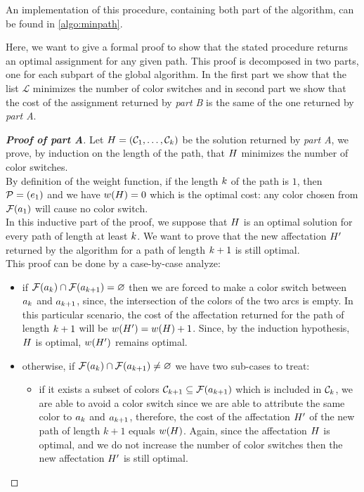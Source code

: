 An implementation of this procedure, containing both part of the algorithm, can be found in \cref{algo:minpath}.

Here, we want to give a formal proof to show that the stated procedure returns an optimal assignment for any given path. This proof is decomposed in two parts, one for each subpart of the global algorithm. In the first part we show that the list $\mathcal{L}$ minimizes the number of color switches and in second part we show that the cost of the assignment returned by \textit{part B} is the same of the one returned by \textit{part A}.

\begin{proof}[\normalfont\textbf{Proof of \textit{part A}}]
	\def\solPartOne{\affect}
	Let $\solPartOne = \row{\C}{\len}$ be the solution returned by \textit{part A}, we prove, by induction on the length of the path, that $\solPartOne$ minimizes the number of color switches. \\
	By definition of the weight function, if the length $k$ of the path is $1$, then $\mathcal{P} = (e_1)$ and we have $\weight(\solPartOne) = 0$ which is the optimal cost: any color chosen from $\mathcal{F}(a_1)$ will cause no color switch.\\
	In this inductive part of the proof, we suppose that $\solPartOne$ is an optimal solution for every path of length at least $k$. We want to prove that the new affectation $\solPartOne'$ returned by the algorithm for a path of length $k+1$ is still optimal. \\
	This proof can be done by a case-by-case analyze:

	\begin{itemize}
		\item if $\mathcal{F}(a_k) \cap \mathcal{F}(a_{k+1}) = \varnothing$ then we are forced to make a color switch between $a_k$ and $a_{k+1}$, since, the intersection of the colors of the two arcs is empty. In this particular scenario, the cost of the affectation returned for the path of length $k + 1$ will be $\weight(\solPartOne') = \weight(\solPartOne) + 1$. Since, by the induction hypothesis, $\solPartOne$ is optimal, $w(H')$ remains optimal.
		\item otherwise, if $\mathcal{F}(a_k) \cap \mathcal{F}(a_{k+1}) \neq \varnothing$ we have two sub-cases to treat:
		      \begin{itemize}

			      \item if it exists a subset of colors $\mathcal{C}_{k+1} \subseteq \mathcal{F}(a_{k+1})$ which is included in $\mathcal{C}_k$, we are able to avoid a color switch since we are able to attribute the same color to $a_k$ and $a_{k+1}$, therefore, the cost of the affectation $\solPartOne'$ of the new path of length $k+1$ equals $\weight(\solPartOne)$. Again, since the affectation $\solPartOne$ is optimal, and we do not increase the number of color switches then the new affectation $\solPartOne'$ is still optimal.


\end{itemize}
\end{itemize}
\end{proof}
